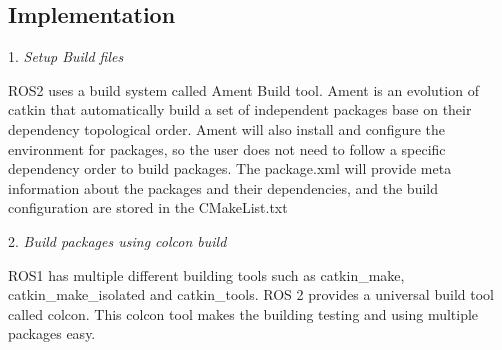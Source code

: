 \documentclass[letterpaper, 10 pt, conference]{ieeeconf}  %
\begin{document}
\subsection{Implementation}

1. \textit{Setup Build files} \par \vspace{5pt}
 ROS2 uses a build system called Ament Build tool. Ament is an evolution of catkin that automatically build a set of independent packages base on their dependency topological order. Ament will also install and configure the environment for packages, so the user does not need to follow a specific dependency order to build packages. The package.xml will provide meta information about the packages and their dependencies, and the build configuration are stored in the CMakeList.txt  \par \vspace{5pt}
 
2. \textit{Build packages using colcon build}\par\vspace{5pt}
ROS1 has multiple different building tools such as catkin\_make, catkin\_make\_isolated and catkin\_tools. ROS 2 provides a universal build tool called colcon. This colcon tool makes the building testing and using multiple packages easy. \par\vspace{5pt}
\end{document}
